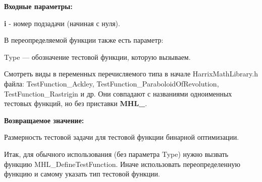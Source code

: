 \textbf{Входные параметры:}

\textbf{i} - номер подзадачи (начиная с нуля).

В переопределяемой функции также есть параметр:
  
Type --- обозначение тестовой функции, которую вызываем. 

Смотреть виды в переменных перечисляемого типа в начале HarrixMathLibrary.h файла: TestFunction\_Ackley, TestFunction\_ParaboloidOfRevolution, TestFunction\_Rastrigin и др. Они совпадают с названиями одноименных тестовых функций, но без приставки \textbf{MHL\_}.

\textbf{Возвращаемое значение:}
 
Размерность тестовой задачи для тестовой функции бинарной оптимизации.

Итак, для обычного использования (без параметра Type) нужно вызвать функцию MHL\_DefineTestFunction. Иначе использовать переопределенную функцию и самому указать тип тестовой функции.